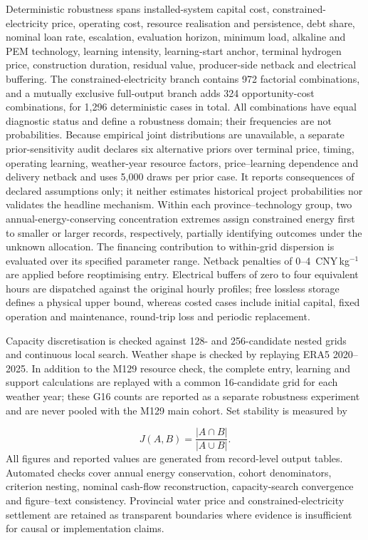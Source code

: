 \documentclass[11pt,a4paper]{article}
\newcommand{\cnykg}{CNY\,kg$^{-1}$}
\begin{document}
Deterministic robustness spans installed-system capital cost, constrained-electricity price, operating cost, resource realisation and persistence, debt share, nominal loan rate, escalation, evaluation horizon, minimum load, alkaline and PEM technology, learning intensity, learning-start anchor, terminal hydrogen price, construction duration, residual value, producer-side netback and electrical buffering. The constrained-electricity branch contains 972 factorial combinations, and a mutually exclusive full-output branch adds 324 opportunity-cost combinations, for 1,296 deterministic cases in total. All combinations have equal diagnostic status and define a robustness domain; their frequencies are not probabilities. Because empirical joint distributions are unavailable, a separate prior-sensitivity audit declares six alternative priors over terminal price, timing, operating learning, weather-year resource factors, price--learning dependence and delivery netback and uses 5,000 draws per prior case. It reports consequences of declared assumptions only; it neither estimates historical project probabilities nor validates the headline mechanism. Within each province--technology group, two annual-energy-conserving concentration extremes assign constrained energy first to smaller or larger records, respectively, partially identifying outcomes under the unknown allocation. The financing contribution to within-grid dispersion is evaluated over its specified parameter range. Netback penalties of 0--4~\cnykg{} are applied before reoptimising entry. Electrical buffers of zero to four equivalent hours are dispatched against the original hourly profiles; free lossless storage defines a physical upper bound, whereas costed cases include initial capital, fixed operation and maintenance, round-trip loss and periodic replacement.

Capacity discretisation is checked against 128- and 256-candidate nested grids and continuous local search. Weather shape is checked by replaying ERA5 2020--2025. In addition to the M129 resource check, the complete entry, learning and support calculations are replayed with a common 16-candidate grid for each weather year; these G16 counts are reported as a separate robustness experiment and are never pooled with the M129 main cohort. Set stability is measured by

\begin{equation}
J(A,B)=\frac{|A\cap B|}{|A\cup B|}.
\label{eq:jaccard}
\end{equation}
All figures and reported values are generated from record-level output tables. Automated checks cover annual energy conservation, cohort denominators, criterion nesting, nominal cash-flow reconstruction, capacity-search convergence and figure--text consistency. Provincial water price and constrained-electricity settlement are retained as transparent boundaries where evidence is insufficient for causal or implementation claims.
\end{document}
